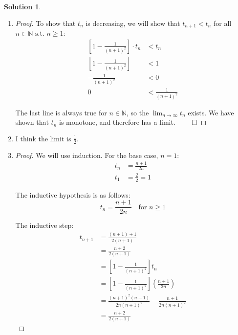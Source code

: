 \documentclass[12pt]{article}
\theoremstyle{definition} %
\newtheorem{solution}{Solution}
\theoremstyle{plain} %
\begin{document}
\begin{solution}
    \begin{enumerate}
        \item \begin{proof}
            To show that \(t_n\) is decreasing, we will show that \(t_{n+1} < t_n\) for all \(n \in \mathbb{N} \text{ s.t. } n \geq 1\):
            \begin{align}
                \left[1 - \frac{1}{(n+1)^2}\right] \cdot t_n &< t_n \tag{66} \\
                \left[1 - \frac{1}{(n+1)^2}\right] &< 1 \tag{67} \\
                -\frac{1}{(n+1)^2} &< 0 \tag{68} \\
                0 &< \frac{1}{(n+1)^2} \tag{69}
            \end{align}
        
            The last line is always true for \(n \in \mathbb{N}\), so the \(\lim_{n \to \infty} t_n\) exists. We have shown that \(t_n\) is monotone, and therefore has a limit. \(\qed\)
        \end{proof}
        \item I think the limit is $\frac{1}{2}$.
        \item \begin{proof}
            We will use induction. For the base case, \(n = 1\):
            \begin{align}
                t_n &= \frac{n + 1}{2n} \tag{70} \\
                t_1 &= \frac{2}{2} = 1 \tag{71}
            \end{align}
        
            The inductive hypothesis is as follows:
            \[
            t_n = \frac{n + 1}{2n} \quad \text{for } n \geq 1 \tag{72}
            \]
        
            The inductive step:
            \begin{align}
                t_{n+1} &= \frac{(n+1) + 1}{2(n+1)} \tag{74} \\
                &= \frac{n + 2}{2(n+1)} \tag{75} \\
                &= \left[ 1 - \frac{1}{(n+1)^2} \right] t_n \tag{76} \\
                &= \left[ 1 - \frac{1}{(n+1)^2} \right] \left( \frac{n+1}{2n} \right) \tag{77} \\
                &= \frac{(n+1)^2 (n+1)}{2n(n+1)^2} - \frac{n+1}{2n(n+1)^2} \tag{78} \\
                &= \frac{n+2}{2(n+1)} \tag{79}
            \end{align}
        

\end{proof}
\end{enumerate}
\end{solution}
\end{document}
